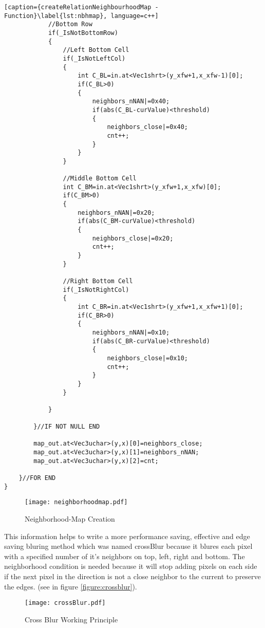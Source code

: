 \begin{lstlisting}[caption={createRelationNeighbourhoodMap - Function}\label{lst:nbhmap}, language=c++]
			//Bottom Row
			if(_IsNotBottomRow)
			{
				//Left Bottom Cell
				if(_IsNotLeftCol)
				{
					int C_BL=in.at<Vec1shrt>(y_xfw+1,x_xfw-1)[0];
					if(C_BL>0)
					{
						neighbors_nNAN|=0x40;
						if(abs(C_BL-curValue)<threshold)
						{
							neighbors_close|=0x40;
							cnt++;
						}
					}
				}

				//Middle Bottom Cell
				int C_BM=in.at<Vec1shrt>(y_xfw+1,x_xfw)[0];
				if(C_BM>0)
				{
					neighbors_nNAN|=0x20;
					if(abs(C_BM-curValue)<threshold)
					{
						neighbors_close|=0x20;
						cnt++;
					}
				}

				//Right Bottom Cell
				if(_IsNotRightCol)
				{
					int C_BR=in.at<Vec1shrt>(y_xfw+1,x_xfw+1)[0];
					if(C_BR>0)
					{
						neighbors_nNAN|=0x10;
						if(abs(C_BR-curValue)<threshold)
						{
							neighbors_close|=0x10;
							cnt++;
						}
					}
				}

			}

		}//IF NOT NULL END

		map_out.at<Vec3uchar>(y,x)[0]=neighbors_close;
		map_out.at<Vec3uchar>(y,x)[1]=neighbors_nNAN;
		map_out.at<Vec3uchar>(y,x)[2]=cnt;

	}//FOR END
}
\end{lstlisting}


\begin{figure}[htp]
\begin{center}
  \texttt{[image: neighborhoodmap.pdf]}
  \caption{Neighborhood-Map Creation}
  \label{figure:neighborhoodmap}
\end{center}
\end{figure}

This information helps to write a more performance saving, effective and edge saving bluring method which 
was named crossBlur because it blures each pixel with a specified number of it's neighbors on top, left, right and bottom.
The neighborhood condition is needed because it will stop adding pixels on each side if the next pixel in the direction 
is not a close neighbor to the current to preserve the edges. (see in figure \vref{figure:crossblur}).

\begin{figure}[htp]
\begin{center}
  \texttt{[image: crossBlur.pdf]}
  \caption{Cross Blur Working Principle}
  \label{figure:crossblur}
\end{center}
\end{figure} 



